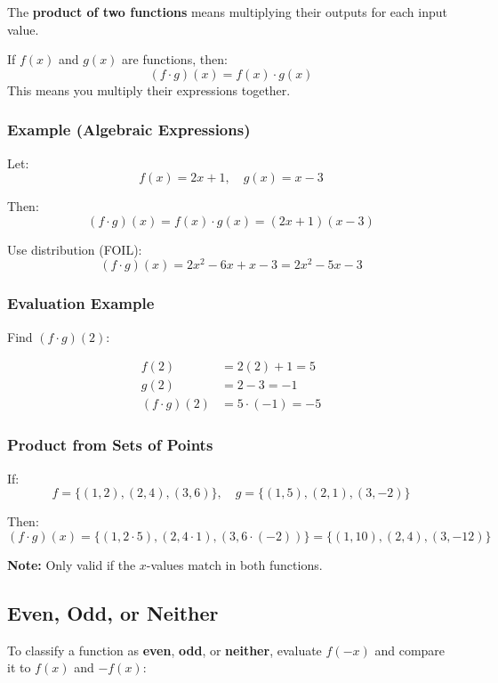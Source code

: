 \documentclass[11pt]{article}
\begin{document}
The \textbf{product of two functions} means multiplying their outputs for each input value.

\begin{tcolorbox}[colback=yellow!5!white, colframe=yellow!80!black, title=Product of Functions]
If \( f(x) \) and \( g(x) \) are functions, then:
\[
(f \cdot g)(x) = f(x) \cdot g(x)
\]
This means you multiply their expressions together.
\end{tcolorbox}

\subsubsection*{Example (Algebraic Expressions)}

Let:
\[
f(x) = 2x + 1, \quad g(x) = x - 3
\]

Then:
\[
(f \cdot g)(x) = f(x) \cdot g(x) = (2x + 1)(x - 3)
\]

Use distribution (FOIL):
\[
(f \cdot g)(x) = 2x^2 - 6x + x - 3 = 2x^2 - 5x - 3
\]

\subsubsection*{Evaluation Example}

Find \( (f \cdot g)(2) \):

\begin{align*}
f(2) &= 2(2) + 1 = 5 \\
g(2) &= 2 - 3 = -1 \\
(f \cdot g)(2) &= 5 \cdot (-1) = -5
\end{align*}

\subsubsection{Product from Sets of Points}

If:
\[
f = \{ (1, 2), (2, 4), (3, 6) \}, \quad g = \{ (1, 5), (2, 1), (3, -2) \}
\]

Then:
\[
(f \cdot g)(x) = \{ (1, 2 \cdot 5), (2, 4 \cdot 1), (3, 6 \cdot (-2)) \} = \{ (1, 10), (2, 4), (3, -12) \}
\]

\textbf{Note:} Only valid if the \( x \)-values match in both functions.

\subsection{Even, Odd, or Neither}

To classify a function as \textbf{even}, \textbf{odd}, or \textbf{neither}, evaluate \( f(-x) \) and compare it to \( f(x) \) and \( -f(x) \):
\end{document}
